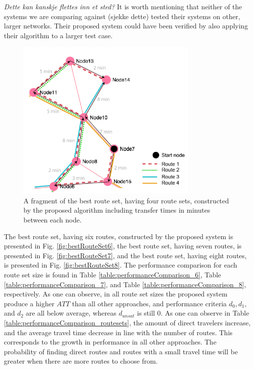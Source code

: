 \emph{\color{blue}Dette kan kanskje flettes inn et sted?}
It is worth mentioning that neither of the systems we are comparing against (sjekke dette) tested their systems on other, larger networks. Their proposed system could have been verified by also applying their algorithm to a larger test case.


\begin{figure}[H]
    \begin{center}
    \includegraphics[width=3.5in]{assets/mandl_withTT_utsnitt.png}
    \end{center}
    \caption{A fragment of the best route set, having four route sets, constructed by the proposed algorithm including transfer times in minutes between each node.}
    \label{fig:mandlWithTT} 
\end{figure}

The best route set, having six routes, constructed by the proposed system is presented in Fig. \vref{fig:bestRouteSet6}, the best route set, having seven routes, is presented in Fig. \vref{fig:bestRouteSet7}, and the best route set, having eight routes, is presented in Fig. \vref{fig:bestRouteSet8}. The performance comparison for each route set size is found in Table \vref{table:performanceComparison_6}, Table \vref{table:performanceComparison_7}, and Table \vref{table:performanceComparison_8}, respectively. As one can observe, in all route set sizes the proposed system produce a higher $ATT$ than all other approaches, and performance criteria $d_0, d_1,$ and $d_{2}$ are all below average, whereas $d_{unsat}$ is still 0.   As one can observe in Table \vref{table:performanceComparison_routesets}, the amount of direct travelers increase, and the average travel time decrease in line with the number of routes. This corresponds to the growth in performance in all other approaches. The probability of finding direct routes and routes with a small travel time will be greater when there are more routes to choose from. 


